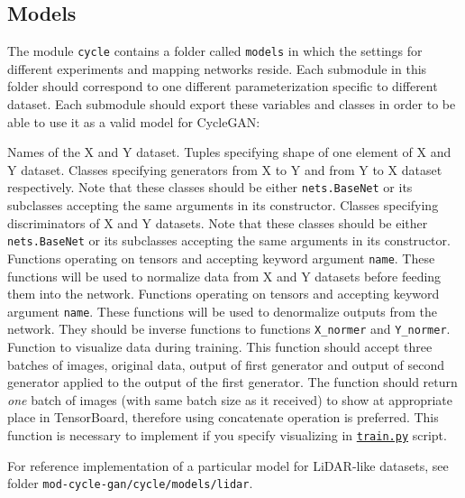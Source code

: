 \subsection{Models}

The module \texttt{cycle} contains a folder called \texttt{models} in which the settings for different experiments and mapping networks reside. Each submodule in this folder should correspond to one different parameterization specific to different dataset. Each submodule should export these variables and classes in order to be able to use it as a valid model for CycleGAN:

\begin{description}
 Names of the X and Y dataset.
 Tuples specifying shape of one element of X and Y dataset.
 Classes specifying generators from X to Y and from Y to X dataset respectively. Note that these classes should be either \texttt{nets.BaseNet} or its subclasses accepting the same arguments in its constructor.
 Classes specifying discriminators of X and Y datasets. Note that these classes should be either \texttt{nets.BaseNet} or its subclasses accepting the same arguments in its constructor.
 Functions operating on tensors and accepting keyword argument \texttt{name}. These functions will be used to normalize data from X and Y datasets before feeding them into the network.
 Functions operating on tensors and accepting keyword argument \texttt{name}. These functions will be used to denormalize outputs from the network. They should be inverse functions to functions \texttt{X\_normer} and \texttt{Y\_normer}.
 Function to visualize data during training. This function should accept three batches of images, original data, output of first generator and output of second generator applied to the output of the first generator. The function should return {\em one} batch of images (with same batch size as it received) to show at appropriate place in TensorBoard, therefore using concatenate operation is preferred. This function is necessary to implement if you specify visualizing in \hyperref[trainpy]{\texttt{train.py}} script.
\end{description}

For reference implementation of a particular model for LiDAR-like datasets, see folder \texttt{mod-cycle-gan/cycle/models/lidar}.

